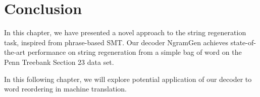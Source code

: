 \section{Conclusion}

In this chapter, we have presented a novel approach to the string regeneration
task, inspired from phrase-based SMT. Our decoder NgramGen achieves state-of-the-art
performance on string regeneration from a simple bag of word on the Penn Treebank
Section 23 data set.

In this following chapter, we will explore potential application of our decoder
to word reordering in machine translation.


%



